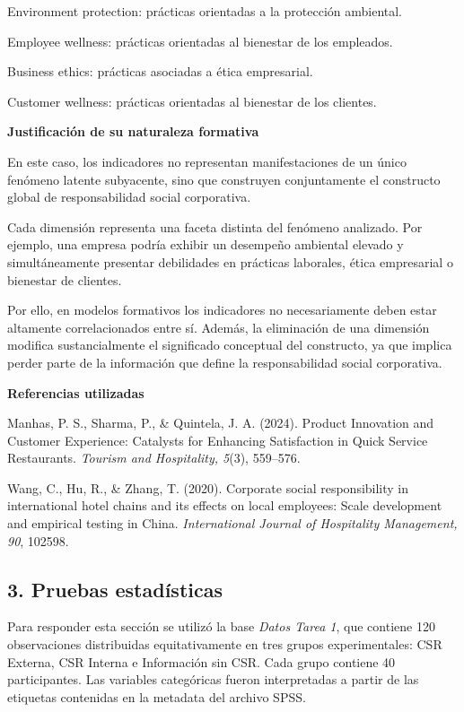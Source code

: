 \documentclass[12pt,letterpaper]{article}
\begin{document}
\begin{opciones}
\item Environment protection: prácticas orientadas a la protección ambiental.
\item Employee wellness: prácticas orientadas al bienestar de los empleados.
\item Business ethics: prácticas asociadas a ética empresarial.
\item Customer wellness: prácticas orientadas al bienestar de los clientes.
\end{opciones}

\textbf{Justificación de su naturaleza formativa}

En este caso, los indicadores no representan manifestaciones de un único fenómeno latente subyacente, sino que construyen conjuntamente el constructo global de responsabilidad social corporativa.

Cada dimensión representa una faceta distinta del fenómeno analizado. Por ejemplo, una empresa podría exhibir un desempeño ambiental elevado y simultáneamente presentar debilidades en prácticas laborales, ética empresarial o bienestar de clientes.

Por ello, en modelos formativos los indicadores no necesariamente deben estar altamente correlacionados entre sí. Además, la eliminación de una dimensión modifica sustancialmente el significado conceptual del constructo, ya que implica perder parte de la información que define la responsabilidad social corporativa.

\textbf{Referencias utilizadas}

Manhas, P. S., Sharma, P., \& Quintela, J. A. (2024). Product Innovation and Customer Experience: Catalysts for Enhancing Satisfaction in Quick Service Restaurants. \textit{Tourism and Hospitality, 5}(3), 559--576.

Wang, C., Hu, R., \& Zhang, T. (2020). Corporate social responsibility in international hotel chains and its effects on local employees: Scale development and empirical testing in China. \textit{International Journal of Hospitality Management, 90}, 102598.


\subsection*{3. Pruebas estadísticas}

Para responder esta sección se utilizó la base \textit{Datos Tarea 1}, que contiene 120 observaciones distribuidas equitativamente en tres grupos experimentales: CSR Externa, CSR Interna e Información sin CSR. Cada grupo contiene 40 participantes. Las variables categóricas fueron interpretadas a partir de las etiquetas contenidas en la metadata del archivo SPSS.
\end{document}
